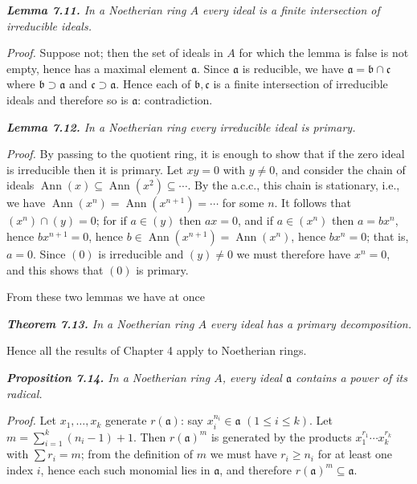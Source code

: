 \medskip
\noindent\textit{\textbf{Lemma 7.11.} In a Noetherian ring $A$ every ideal is a finite intersection of
irreducible ideals.}

\noindent\emph{Proof.}  Suppose not; then the set of ideals in $A$ for which the lemma is false is
not empty, hence has a maximal element $\mathfrak a$.  Since $\mathfrak a$ is reducible, we have
$\mathfrak a=\mathfrak b\cap\mathfrak c$ where $\mathfrak b\supset\mathfrak a$ and $\mathfrak c\supset\mathfrak a$.  Hence each of $\mathfrak b,\mathfrak c$ is a finite intersection of
irreducible ideals and therefore so is $\mathfrak a$: contradiction.\proofbox

\medskip
\noindent\textit{\textbf{Lemma 7.12.} In a Noetherian ring every irreducible ideal is primary.}

\noindent\emph{Proof.}  By passing to the quotient ring, it is enough to show that if the zero ideal
is irreducible then it is primary.  Let $xy=0$ with $y\ne0$, and consider the chain
of ideals $\operatorname{Ann}(x)\subseteq\operatorname{Ann}(x^2)\subseteq\cdots$.  By the a.c.c., this chain is stationary, i.e., we
have $\operatorname{Ann}(x^n)=\operatorname{Ann}(x^{n+1})=\cdots$ for some $n$.  It follows that $(x^n)\cap(y)=0$;
for if $a\in(y)$ then $ax=0$, and if $a\in(x^n)$ then $a=bx^n$, hence $bx^{n+1}=0$, hence
$b\in\operatorname{Ann}(x^{n+1})=\operatorname{Ann}(x^n)$, hence $bx^n=0$; that is, $a=0$.  Since $(0)$ is irreducible
and $(y)\ne0$ we must therefore have $x^n=0$, and this shows that $(0)$ is primary.\proofbox

From these two lemmas we have at once

\medskip
\noindent\textit{\textbf{Theorem 7.13.} In a Noetherian ring $A$ every ideal has a primary decomposition.}\proofbox

Hence all the results of Chapter 4 apply to Noetherian rings.

\medskip
\noindent\textit{\textbf{Proposition 7.14.} In a Noetherian ring $A$, every ideal $\mathfrak a$ contains a power of
its radical.}

\noindent\emph{Proof.}  Let $x_1,\ldots,x_k$ generate $r(\mathfrak a)$: say $x_i^{n_i}\in\mathfrak a$ $(1\leq i\leq k)$.  Let $m=
\sum_{i=1}^k(n_i-1)+1$.  Then $r(\mathfrak a)^m$ is generated by the products $x_1^{r_1}\cdots x_k^{r_k}$ with
$\sum r_i=m$; from the definition of $m$ we must have $r_i\geq n_i$ for at least one index $i$,
hence each such monomial lies in $\mathfrak a$, and therefore $r(\mathfrak a)^m\subseteq\mathfrak a$.\proofbox

